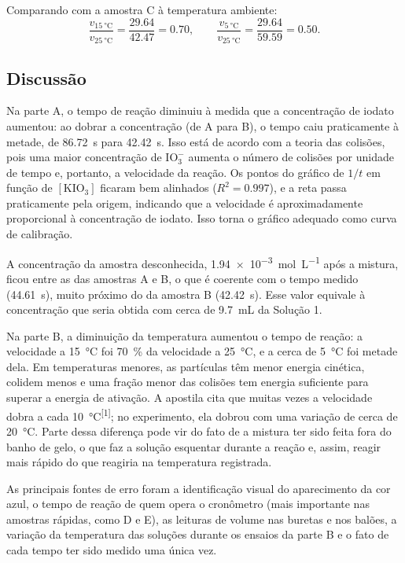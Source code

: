 Comparando com a amostra C à temperatura ambiente:
\[
\frac{v_{\SI{15}{\degreeCelsius}}}{v_{\SI{25}{\degreeCelsius}}} = \frac{\num{29,64}}{\num{42,47}} = \num{0,70},
\qquad
\frac{v_{\SI{5}{\degreeCelsius}}}{v_{\SI{25}{\degreeCelsius}}} = \frac{\num{29,64}}{\num{59,59}} = \num{0,50}.
\]

\subsection{Discussão}

Na parte A, o tempo de reação diminuiu à medida que a concentração de iodato aumentou: ao dobrar a concentração (de A para B), o tempo caiu praticamente à metade, de \SI{86,72}{s} para \SI{42,42}{s}. Isso está de acordo com a teoria das colisões, pois uma maior concentração de $\mathrm{IO_3^-}$ aumenta o número de colisões por unidade de tempo e, portanto, a velocidade da reação. Os pontos do gráfico de $1/t$ em função de $[\mathrm{KIO_3}]$ ficaram bem alinhados ($R^2 = \num{0,997}$), e a reta passa praticamente pela origem, indicando que a velocidade é aproximadamente proporcional à concentração de iodato. Isso torna o gráfico adequado como curva de calibração.

A concentração da amostra desconhecida, \SI{1,94e-3}{mol.L^{-1}} após a mistura, ficou entre as das amostras A e B, o que é coerente com o tempo medido (\SI{44,61}{s}), muito próximo do da amostra B (\SI{42,42}{s}). Esse valor equivale à concentração que seria obtida com cerca de \SI{9,7}{mL} da Solução 1.

Na parte B, a diminuição da temperatura aumentou o tempo de reação: a velocidade a \SI{15}{\degreeCelsius} foi \SI{70}{\%} da velocidade a \SI{25}{\degreeCelsius}, e a cerca de \SI{5}{\degreeCelsius} foi metade dela. Em temperaturas menores, as partículas têm menor energia cinética, colidem menos e uma fração menor das colisões tem energia suficiente para superar a energia de ativação. A apostila cita que muitas vezes a velocidade dobra a cada \SI{10}{\degreeCelsius}\textsuperscript{[1]}; no experimento, ela dobrou com uma variação de cerca de \SI{20}{\degreeCelsius}. Parte dessa diferença pode vir do fato de a mistura ter sido feita fora do banho de gelo, o que faz a solução esquentar durante a reação e, assim, reagir mais rápido do que reagiria na temperatura registrada.

As principais fontes de erro foram a identificação visual do aparecimento da cor azul, o tempo de reação de quem opera o cronômetro (mais importante nas amostras rápidas, como D e E), as leituras de volume nas buretas e nos balões, a variação da temperatura das soluções durante os ensaios da parte B e o fato de cada tempo ter sido medido uma única vez.

